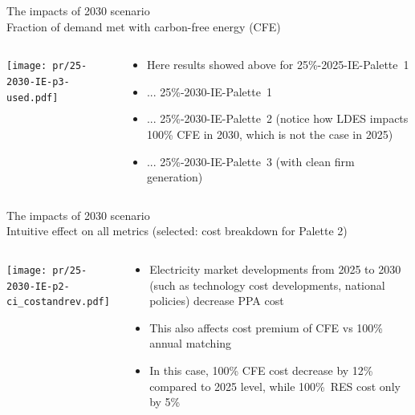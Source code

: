 \begin{frame}{The impacts of 2030 scenario  \\ 
Fraction of demand met with carbon-free energy (CFE) }

\begin{columns}[T]
\begin{column}{9cm}
\centering

\texttt{[image: pr/25-2030-IE-p3-used.pdf]}
\end{column}
\begin{column}{5cm}

  \begin{itemize}
  \item Here results showed above for 25\%-\alert{2025}-IE-Palette~1
  \item ... 25\%-\alert{2030}-IE-Palette~1
  \item ... 25\%-\alert{2030}-IE-Palette~2 (notice how LDES impacts 100\% CFE in 2030, which is not the case in 2025)
 \item ... 25\%-\alert{2030}-IE-Palette~3 (with clean firm generation)
  \end{itemize}
  
\end{column}
\end{columns}

\end{frame}


\begin{frame}{The impacts of 2030 scenario\\
Intuitive effect on all metrics (selected: cost breakdown for Palette 2)}

\begin{columns}[T]
\begin{column}{9cm}
\centering

\texttt{[image: pr/25-2030-IE-p2-ci\_costandrev.pdf]}
\end{column}
\begin{column}{5cm}

  \begin{itemize}
  \item Electricity market developments from 2025 to 2030 (such as technology cost developments, national policies) \alert{decrease PPA cost}
  \item This also \alert{affects cost premium} of CFE vs 100\% annual matching 
  \item In this case, 100\% CFE cost decrease by 12\% compared to 2025 level, while 100\%~RES cost only by 5\%
 
  \end{itemize}
\end{column}
\end{columns}

\end{frame}

